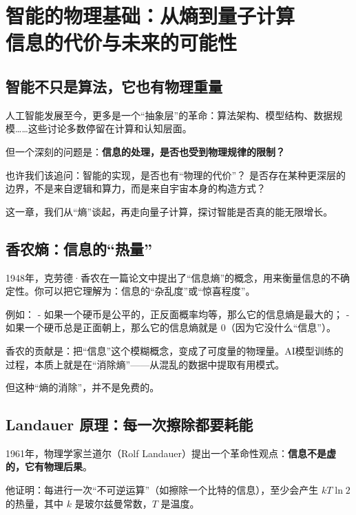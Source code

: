 \chapter{智能的物理基础：从熵到量子计算\texorpdfstring{\\}{ }信息的代价与未来的可能性}


\section*{智能不只是算法，它也有物理重量}

人工智能发展至今，更多是一个“抽象层”的革命：算法架构、模型结构、数据规模……这些讨论多数停留在计算和认知层面。

但一个深刻的问题是：\textbf{信息的处理，是否也受到物理规律的限制？}

也许我们该追问：智能的实现，是否也有“物理的代价”？  
是否存在某种更深层的边界，不是来自逻辑和算力，而是来自宇宙本身的构造方式？

这一章，我们从“熵”谈起，再走向量子计算，探讨智能是否真的能无限增长。

\section*{香农熵：信息的“热量”}

1948年，克劳德·香农在一篇论文中提出了“信息熵”的概念，用来衡量信息的不确定性。你可以把它理解为：信息的“杂乱度”或“惊喜程度”。

例如：
- 如果一个硬币是公平的，正反面概率均等，那么它的信息熵是最大的；
- 如果一个硬币总是正面朝上，那么它的信息熵就是 0（因为它没什么“信息”）。

香农的贡献是：把“信息”这个模糊概念，变成了可度量的物理量。AI模型训练的过程，本质上就是在“消除熵”——从混乱的数据中提取有用模式。

但这种“熵的消除”，并不是免费的。

\section*{Landauer 原理：每一次擦除都要耗能}

1961年，物理学家兰道尔（Rolf Landauer）提出一个革命性观点：\textbf{信息不是虚的，它有物理后果}。

他证明：每进行一次“不可逆运算”（如擦除一个比特的信息），至少会产生 $kT\ln2$ 的热量，其中 $k$ 是玻尔兹曼常数，$T$ 是温度。

